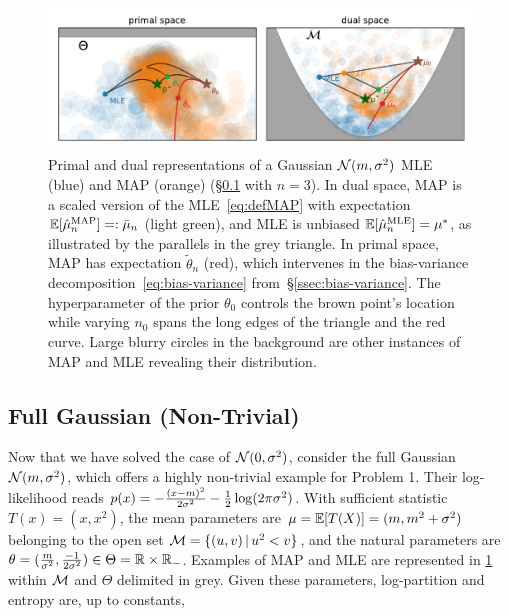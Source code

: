 \documentclass[twoside]{article}
\newcommand{\cond}{\,\vert\,}
\newcommand{\logpart}{A}
\newcommand{\conj}{{\logpart^*}}
\newcommand{\nat}{\theta}
\newcommand{\m}{\mu}
\begin{document}
\begin{figure}[t]
	\centering
	\includegraphics[width=.8\textwidth]{figs/thales/numerical_schema_n=3.pdf}
	\caption{
	Primal and dual representations of a Gaussian ${\mathcal N}(m,\sigma^2)$ MLE (blue) and MAP (orange) (\S\ref{ssec:gaussian} with $n=3$).
	In dual space, MAP is a scaled version of the MLE~\eqref{eq:defMAP} with expectation $\E[\hat\m_n^\text{MAP}]=:\bar \m_n$ (light green), and MLE is unbiased $\E[\hat\m_n^\text{MLE}]=\m^*$, as illustrated by the parallels in the grey triangle.
	In primal space, MAP has expectation $\tilde \nat_n$ (red), which intervenes in the bias-variance decomposition~\eqref{eq:bias-variance} from~\S\ref{ssec:bias-variance}.
	The hyperparameter of the prior $\nat_0$ controls the brown point's location while varying $n_0$ spans the long edges of the triangle and the red curve.
	Large blurry circles in the background are other instances of MAP and MLE revealing their distribution.
	}
	\label{fig:thales}
\end{figure}

\subsection{Full Gaussian (Non-Trivial)}
\label{ssec:gaussian}
Now that we have solved the case of ${\mathcal N}(0,\sigma^2)$, consider the full Gaussian ${\mathcal N}(m,\sigma^2)$, which offers a highly non-trivial example for Problem 1.
Their log-likelihood reads $p(x) = -\frac{(x-m)^2}{2 \sigma^2} - \frac{1}{2} \log(2\pi\sigma^2)$.
With sufficient statistic $T(x)=(x, x^2)$,
the mean parameters are $\m = \E[T(X)] = (m , m^2 + \sigma^2)$ belonging to the open set $\cM= \{(u,v) \cond u^2 < v\}$,
and the natural parameters are $\nat= (\frac{m}{\sigma^2} , \frac{-1}{2\sigma^2}) \in \Theta = \real \times \real_-$.
Examples of MAP and MLE  are represented in \cref{fig:thales} within ${\mathcal M}$ and $\Theta$ delimited in grey.
Given these parameters, log-partition and entropy are, up to constants,
\alignn{
	\textstyle \logpart(\nat) &= \textstyle \frac{\nat_1^2}{-4\nat_2} - \half \log(-\nat_2) \\ 
	\textstyle \conj(\m) &= \textstyle - \half \log (\mu_2 - \mu_1^2)
}
\end{document}
